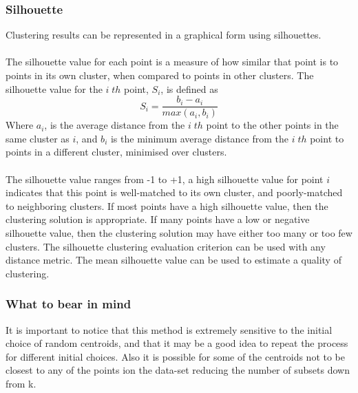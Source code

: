 \subsubsection{Silhouette}
Clustering results can be represented in a graphical form using silhouettes.
\\\\
The silhouette value for each point is a measure of how similar that point is to points in its own cluster, when compared to points in other clusters. The silhouette value for the  $i\;th$ point, $S_i$, is defined as
\begin{equation}
    S_i = \frac{b_i - a_i}{max(a_i,b_i)}
\end{equation}
Where $a_i$, is the average distance from the $i\;th$ point to the other points in the same cluster as $i$, and $b_i$ is the minimum average distance from the $i\;th$ point to points in a different cluster, minimised over clusters.
\\\\
The silhouette value ranges from -1 to +1, a high silhouette value for point $i$ indicates that this point is well-matched to its own cluster, and poorly-matched to neighboring clusters. If most points have a high silhouette value, then the clustering solution is appropriate. If many points have a low or negative silhouette value, then the clustering solution may have either too many or too few clusters. The silhouette clustering evaluation criterion can be used with any distance metric. The mean silhouette value can be used to estimate a quality of clustering.
\subsubsection{What to bear in mind}
It is important to notice that this method is extremely sensitive to the initial choice of random centroids, and that it may be a good idea to repeat the process for different initial choices. Also it is possible for some of the centroids not to be closest to any of the points ion the data-set reducing the number of subsets down from k.

